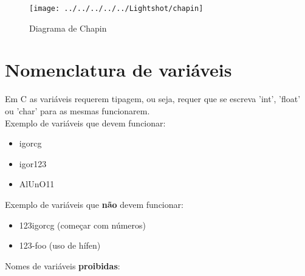 \documentclass[12pt]{article}
\begin{document}
\begin{figure}[h]
	\centering
	\texttt{[image: ../../../../../Lightshot/chapin]}
	\caption{Diagrama de Chapin}
	\label{fig:chapin}
\end{figure}

\section{Nomenclatura de variáveis}
Em C as variáveis requerem tipagem, ou seja, requer que se escreva 'int', 'float' ou 'char' para as mesmas funcionarem. \\
Exemplo de variáveis que devem funcionar:
\begin{itemize}
    \item igor\underline{}cg
    \item igor\underline{}123
    \item AlUnO\underline{\hspace{.10in}}11
\end{itemize}
Exemplo de variáveis que \textbf{não} devem funcionar:
\begin{itemize}
    \item 123igor\underline{\hspace{.10in}}cg (começar com números)
    \item 123-foo (uso de hífen)
\end{itemize}
Nomes de variáveis \textbf{proibidas}:
\end{document}
